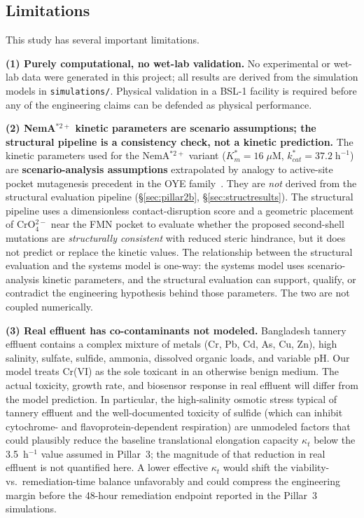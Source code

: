\documentclass[10pt,twocolumn,letterpaper,
              colorlinks=true,
              linkcolor=blue!70!black,
              citecolor=blue!70!black,
              urlcolor=blue!70!black,
              pdfborder={0 0 0}]{article}
\begin{document}
\subsection{Limitations}

This study has several important limitations.

\medskip
\noindent\textbf{(1) Purely computational, no wet-lab validation.}
No experimental or wet-lab data were generated in this project; all
results are derived from the simulation models in \texttt{simulations/}.
Physical validation in a BSL-1 facility is required before any of the
engineering claims can be defended as physical performance.

\medskip
\noindent\textbf{(2) NemA$^{*2+}$ kinetic parameters are scenario
assumptions; the structural pipeline is a consistency check, not a
kinetic prediction.}
The kinetic parameters used for the NemA$^{*2+}$ variant
($K_m^* = 16\;\mu$M, $k_{cat}^* = 37.2\;\text{h}^{-1}$) are
\textbf{scenario-analysis assumptions} extrapolated by analogy to
active-site pocket mutagenesis precedent in the OYE
family~\cite{mowafy2010}. They are \textit{not} derived from the
structural evaluation pipeline (\S\ref{sec:pillar2b},
\S\ref{sec:structresults}). The structural pipeline uses a dimensionless
contact-disruption score and a geometric placement of CrO$_4^{2-}$
near the FMN pocket to evaluate whether the proposed second-shell
mutations are \textit{structurally consistent} with reduced steric
hindrance, but it does not predict or replace the kinetic values. The
relationship between the structural evaluation and the systems model is
one-way: the systems model uses scenario-analysis kinetic parameters,
and the structural evaluation can support, qualify, or contradict the
engineering hypothesis behind those parameters. The two are not coupled
numerically.

\medskip
\noindent\textbf{(3) Real effluent has co-contaminants not modeled.}
Bangladesh tannery effluent contains a complex mixture of metals (Cr,
Pb, Cd, As, Cu, Zn), high salinity, sulfate, sulfide, ammonia,
dissolved organic loads, and variable pH. Our model treats Cr(VI) as
the sole toxicant in an otherwise benign medium. The actual toxicity,
growth rate, and biosensor response in real effluent will differ from
the model prediction. In particular, the high-salinity osmotic stress
typical of tannery effluent and the well-documented toxicity of
sulfide (which can inhibit cytochrome- and flavoprotein-dependent
respiration) are unmodeled factors that could plausibly reduce the
baseline translational elongation capacity $\kappa_t$ below the
3.5~h$^{-1}$ value assumed in Pillar~3; the magnitude of that
reduction in real effluent is not quantified here. A lower effective
$\kappa_t$ would shift the viability-vs.\ remediation-time balance
unfavorably and could compress the engineering margin before the
48-hour remediation endpoint reported in the Pillar~3 simulations.
\end{document}
